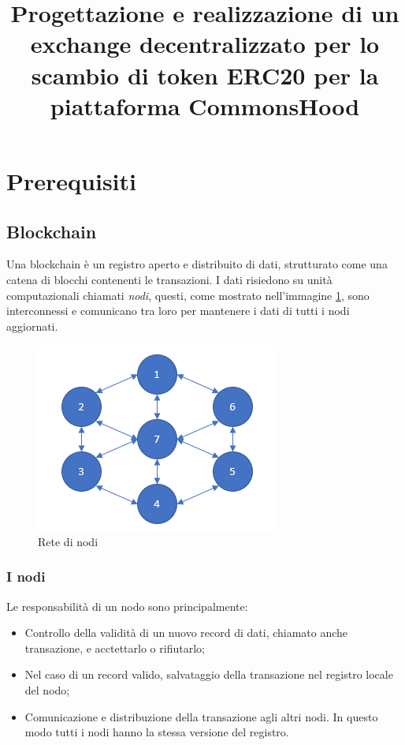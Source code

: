 \documentclass[a4paper]{article}
\title{Progettazione e realizzazione di un exchange decentralizzato per lo scambio di token ERC20 per la piattaforma CommonsHood}
\begin{document}
    \tableofcontents
    \newpage
    \section{Prerequisiti}
    \subsection{Blockchain}
    Una blockchain è un registro aperto e distribuito di dati, strutturato come una catena di blocchi contenenti le transazioni.
    I dati risiedono su unità computazionali chiamati \emph{nodi}, questi, come mostrato nell'immagine \ref{fig:node},
    sono interconnessi e comunicano tra loro per mantenere i dati di tutti i nodi aggiornati.\cite{nodo}
    \begin{figure}[h]
      \includegraphics[scale=0.8]{node.png}
      \centering
      \caption{Rete di nodi}
      \centering
      \label{fig:node}
    \end{figure}
    \subsubsection{I nodi}
    Le responsabilità di un nodo sono principalmente:
    \begin{itemize}
      \item Controllo della validità di un nuovo record di dati, chiamato anche transazione, e acctettarlo o rifiutarlo;
      \item Nel caso di un record valido, salvataggio della transazione nel registro locale del nodo;
      \item Comunicazione e distribuzione della transazione agli altri nodi. In questo modo tutti i nodi hanno la stessa versione del registro.
    \end{itemize}
\end{document}
